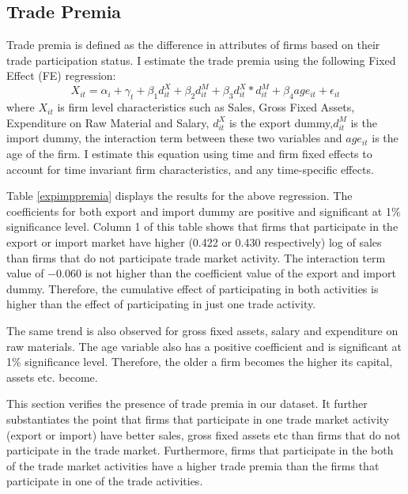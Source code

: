 \documentclass[12pt]{article}
\begin{document}
\subsection{Trade Premia}
Trade premia is defined as the difference in
attributes of firms based on their trade participation status. I
estimate the trade premia using the following Fixed Effect (FE) regression:
\begin{equation}
\label{FE}
 X_{it} = \alpha_i + \gamma_{t} + \beta_{1} d_{it}^{X}+ \beta_{2} d_{it}^{M}+
\beta_{3} d_{it}^{X}*d_{it}^{M} + \beta_{4} age_{it} + \epsilon_{it}
\end{equation}
where $X_{it}$ is firm level characteristics such as Sales, Gross
Fixed Assets, Expenditure on Raw Material and Salary, $d_{it}^X$ is
the export dummy,$d_{it}^M$ is
the import  dummy, the interaction term between these two variables
and $age_{it}$ is the age of the firm. I estimate this equation using
time and firm fixed
effects to account for time invariant firm characteristics, and any
time-specific effects.

\begin{center}

\end{center}

Table \ref{expimppremia} displays the results for the above
regression. The coefficients for both export and import dummy are positive
and significant at 1\% significance level. Column 1 of this table
shows  that firms  that
participate in the export or import market have higher (0.422 or 0.430
respectively) log of sales than
firms that do not participate  trade market activity. The
interaction term value of $-0.060$ is not higher than the coefficient
value of the export and import dummy. Therefore, the cumulative
effect of participating in both activities is higher than the effect
of participating in just one trade activity. 

 The same trend
is also observed for  gross fixed assets, salary and expenditure on
raw materials.  The age variable also
has a positive coefficient and is significant at 1\% significance
level. Therefore, the older a firm becomes the higher its capital,
assets etc. become. 

This section verifies the presence of trade premia in our
dataset. It further substantiates the point that firms that
participate in one trade market activity (export or import) have
better sales, gross fixed assets etc than firms that do not
participate in the trade market. Furthermore, firms that participate
in the both of the trade market activities have a higher trade premia
than the firms that participate in one of the trade activities. 
\end{document}
